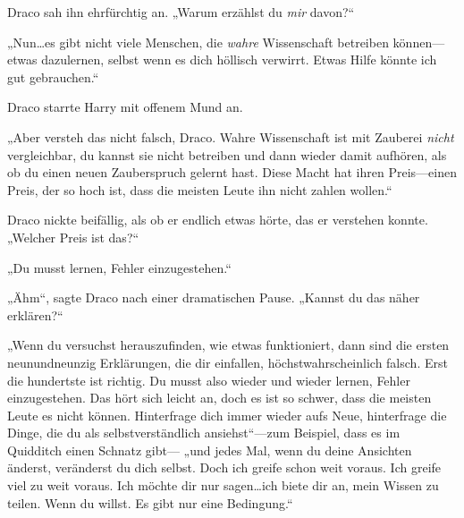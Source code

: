 Draco sah ihn ehrfürchtig an. „Warum erzählst du \emph{mir} davon?“

„Nun…es gibt nicht viele Menschen, die \emph{wahre} Wissenschaft betreiben können—etwas dazulernen, selbst wenn es dich höllisch verwirrt. Etwas Hilfe könnte ich gut gebrauchen.“

Draco starrte Harry mit offenem Mund an.

„Aber versteh das nicht falsch, Draco. Wahre Wissenschaft ist mit Zauberei \emph{nicht} vergleichbar, du kannst sie nicht betreiben und dann wieder damit aufhören, als ob du einen neuen Zauberspruch gelernt hast. Diese Macht hat ihren Preis—einen Preis, der so hoch ist, dass die meisten Leute ihn nicht zahlen wollen.“

Draco nickte beifällig, als ob er endlich etwas hörte, das er verstehen konnte. „Welcher Preis ist das?“

„Du musst lernen, Fehler einzugestehen.“

„Ähm“, sagte Draco nach einer dramatischen Pause. „Kannst du das näher erklären?“

„Wenn du versuchst herauszufinden, wie etwas funktioniert, dann sind die ersten neunundneunzig Erklärungen, die dir einfallen, höchstwahrscheinlich falsch. Erst die hundertste ist richtig. Du musst also wieder und wieder lernen, Fehler einzugestehen. Das hört sich leicht an, doch es ist so schwer, dass die meisten Leute es nicht können. Hinterfrage dich immer wieder aufs Neue, hinterfrage die Dinge, die du als selbstverständlich ansiehst“—zum Beispiel, dass es im Quidditch einen Schnatz gibt— „und jedes Mal, wenn du deine Ansichten änderst, veränderst du dich selbst. Doch ich greife schon weit voraus. Ich greife viel zu weit voraus. Ich möchte dir nur sagen…ich biete dir an, mein Wissen zu teilen. Wenn du willst. Es gibt nur eine Bedingung.“

